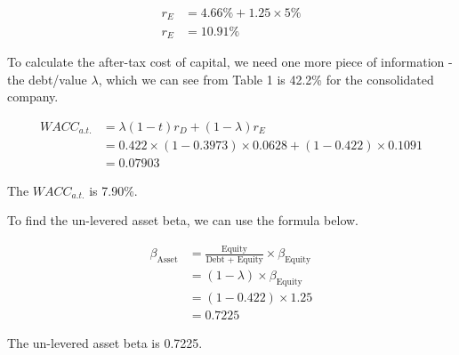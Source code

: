 \documentclass[letterpaper]{article}
\begin{document}
\begin{align*}
r_E &= 4.66\% + 1.25 \times 5\% \\
r_E &= 10.91\%
\end{align*}

To calculate the after-tax cost of capital, we need one more piece of information - the debt/value $\lambda$, which we can see from Table 1 is 42.2\% for the consolidated company.

\begin{align*}
WACC_{a.t.} &= \lambda (1-t) r_D + (1-\lambda)r_E \\
            &= 0.422 \times (1 - 0.3973) \times 0.0628 + (1 - 0.422) \times 0.1091 \\
            &= 0.07903
\end{align*}

The $WACC_{a.t.}$ is 7.90\%.

To find the un-levered asset beta, we can use the formula below.

\begin{align*}
\beta_{\text{Asset}} &= \frac{\text{Equity}}{\text{Debt + Equity}}\times \beta_{\text{Equity}} \\
                    &= (1 - \lambda) \times \beta_{\text{Equity}} \\
                    &= (1 - 0.422) \times 1.25 \\
                    &= 0.7225
\end{align*}

The un-levered asset beta is 0.7225.
\end{document}
